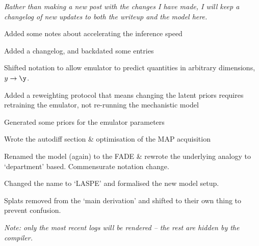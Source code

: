 
\begin{aside}[\bf Changelog]
	\textit{Rather than making a new post with the changes I have made, I will keep a changelog of new updates to both the writeup and the model here.}

	{
		\item Added some notes about accelerating the inference speed
	}

	{
		\item Added a changelog, and backdated some entries
		\item Shifted notation to allow emulator to predict quantities in arbitrary dimensions, $ y \to \y$.
		\item Added a reweighting protocol that means changing the latent priors requires retraining the emulator, not re-running the mechanistic model
		\item Generated some priors for the emulator parameters
	}
	{
		\item Wrote the autodiff section \& optimisation of the MAP acquisition
		\item Renamed the model (again) to the FADE \& rewrote the underlying analogy to `department' based. Commensurate notation change.
	}
	{
		\item Changed the name to `LASPE' and formalised the new model setup.
		\item Splats removed from the `main derivation' and shifted to their own thing to prevent confusion.
	}

	\textit{Note: only the \counterLimit{} most recent logs will be rendered -- the rest are hidden by the compiler.}
\end{aside}
